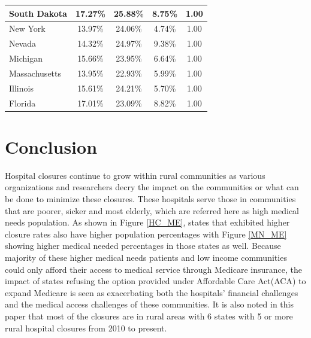 \documentclass[10pt,conference]{IEEEtran}
\begin{document}
\begin{table}[htbp]
\begin{center}
\begin{tabular}{|l|c|c|c|c|}
    \hline
    South Dakota & 17.27\% & 25.88\% & 8.75\% & 1.00 \\
    \hline
    New York & 13.97\% & 24.06\% & 4.74\% & 1.00 \\
    \hline
    Nevada & 14.32\% & 24.97\% & 9.38\% & 1.00 \\
    \hline
    Michigan & 15.66\% & 23.95\% & 6.64\% & 1.00 \\
    \hline
    Massachusetts & 13.95\% & 22.93\% & 5.99\% & 1.00 \\
    \hline
    Illinois & 15.61\% & 24.21\% & 5.70\% & 1.00 \\
    \hline
    Florida & 17.01\% & 23.09\% & 8.82\% & 1.00 \\
    \hline
    \end{tabular}
     \label{tablel}
    \end{center}
\end{table}%

\section{Conclusion}

Hospital closures continue to grow within rural communities as various organizations and researchers decry the impact on the communities or what can be done to minimize these closures. These hospitals serve those in communities that are poorer, sicker and most elderly, which are referred here as high medical needs population. As shown in Figure \ref{HC_ME}, states that exhibited higher closure rates also have higher population percentages with Figure \ref{MN_ME} showing higher medical needed percentages in those states as well. Because majority of these higher medical needs patients and low income communities could only afford their access to medical service through Medicare insurance, the impact of states refusing the option provided under Affordable Care Act(ACA) to expand Medicare is seen as exacerbating both the hospitals’ financial challenges and the medical access challenges of these communities. It is also noted in this paper that most of the closures are in rural areas with 6 states with 5 or more rural hospital closures from 2010 to present.
\end{document}
